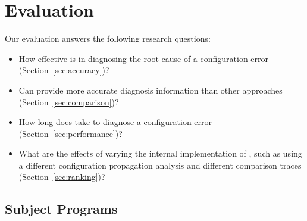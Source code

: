 \section{Evaluation}
\label{sec:evaluation}


Our evaluation answers the following research questions:



\begin{itemize}
\item How effective is \ourtool in diagnosing the root cause of
a configuration error (Section~\ref{sec:accuracy})?
\item Can \ourtool provide more accurate diagnosis information than
other approaches (Section~\ref{sec:comparison})? 
\item How long does \ourtool take to diagnose a configuration error (Section~\ref{sec:performance})?
\item What are the effects of varying the internal implementation of \ourtool,
such as using a different configuration propagation analysis and
different comparison traces (Section~\ref{sec:ranking})?
\end{itemize}


\subsection{Subject Programs}

